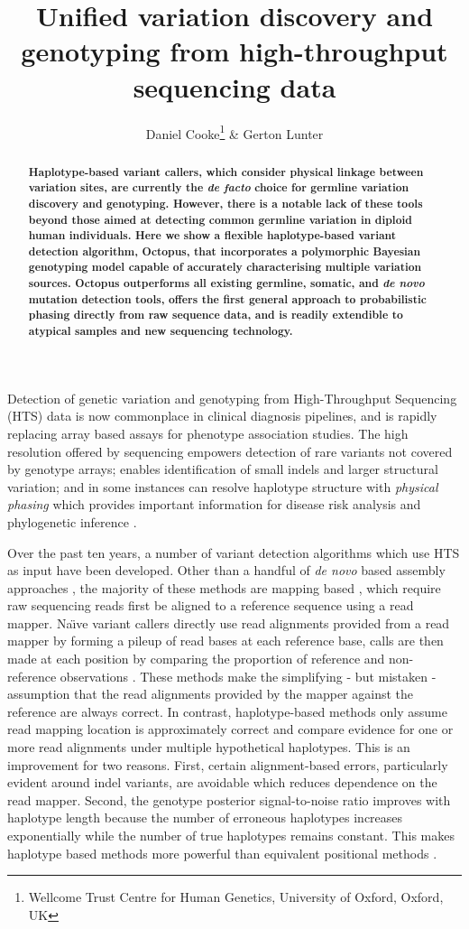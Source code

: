 \documentclass[notitlepage, twocolumn]{article}
\title{Unified variation discovery and genotyping from high-throughput sequencing data}
\author{Daniel Cooke\thanks{Wellcome Trust Centre for Human Genetics, University of Oxford, Oxford, UK} \&
Gerton Lunter\samethanks}
\date{}
\newcommand\invisiblesection[1]{%
  \refstepcounter{section}%
  \addcontentsline{toc}{section}{\protect\numberline{\thesection}#1}%
  \sectionmark{#1}\phantom{}}
\begin{document}
\maketitle
\thispagestyle{empty}

\begin{abstract}\textbf{
Haplotype-based variant callers, which consider physical linkage between variation sites, are currently the \emph{de facto} choice for germline variation discovery and genotyping. However, there is a notable lack of these tools beyond those aimed at detecting common germline variation in diploid human individuals. Here we show a flexible haplotype-based variant detection algorithm, Octopus, that incorporates a polymorphic Bayesian genotyping model capable of accurately characterising multiple variation sources. Octopus outperforms all existing germline, somatic, and \emph{de novo} mutation detection tools, offers the first general approach to probabilistic phasing directly from raw sequence data, and is readily extendible to atypical samples and new sequencing technology.
}\end{abstract}

\invisiblesection{Motivation}

Detection of genetic variation and genotyping from High-Throughput Sequencing (HTS) data is now commonplace in clinical diagnosis pipelines, and is rapidly replacing array based assays for phenotype association studies. The high resolution offered by sequencing empowers detection of rare variants not covered by genotype arrays; enables identification of small indels and larger structural variation; and in some instances can resolve haplotype structure with \emph{physical phasing} which provides important information for disease risk analysis and phylogenetic inference \cite{RN211}.

Over the past ten years, a number of variant detection algorithms which use HTS as input have been developed. Other than a handful of \emph{de novo} based assembly approaches \cite{RN148}, the majority of these methods are mapping based \cite{RN141, RN538, RN5}, which require raw sequencing reads first be aligned to a reference sequence using a read mapper. Na\"\i ve variant callers directly use read alignments provided from a read mapper by forming a pileup of read bases at each reference base, calls are then made at each position by comparing the proportion of reference and non-reference observations \cite{RN537}. These methods make the simplifying - but mistaken - assumption that the read alignments provided by the mapper against the reference are always correct. In contrast, haplotype-based methods only assume read mapping location is approximately correct and compare evidence for one or more read alignments under multiple hypothetical haplotypes. This is an improvement for two reasons. First, certain alignment-based errors, particularly evident around indel variants, are avoidable which reduces dependence on the read mapper. Second, the genotype posterior signal-to-noise ratio improves with haplotype length because the number of erroneous haplotypes increases exponentially while the number of true haplotypes remains constant. This makes haplotype based methods more powerful than equivalent positional methods \cite{RN166}.
\end{document}
